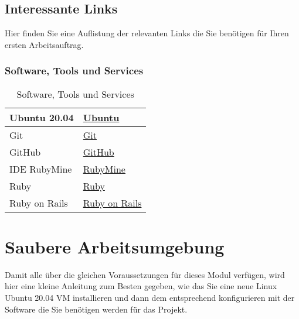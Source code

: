 \subsection{Interessante Links}\label{subsec:links}
\begin{frame}[fragile]
    Hier finden Sie eine Auflistung der relevanten Links die Sie benötigen für Ihren ersten Arbeitsauftrag.
\end{frame}

\begin{frame}[fragile]
    \frametitle<presentation>{Software, Tools und Services}
    \begin{table}[h!]
        \centering
        \begin{tabularx}{0.8\textwidth} {
        | >{\raggedright\arraybackslash}X
        | >{\raggedright\arraybackslash}X | }
            \hline
            Ubuntu 20.04  & \href{https://ubuntu.com/}{Ubuntu}                              \\
            \hline
            Git           & \href{https://git-scm.com/}{Git}                                \\
            \hline
            GitHub        & \href{https://github.com/}{GitHub}                              \\
            \hline
            IDE RubyMine  & \href{https://www.jetbrains.com/de-de/ruby/}{RubyMine}          \\
            \hline
            Ruby          & \href{https://www.ruby-lang.org/de/}{Ruby}                      \\
            \hline
            Ruby on Rails & \href{https://guides.rubyonrails.org/index.html}{Ruby on Rails} \\
            \hline
        \end{tabularx}
        \caption{Software, Tools und Services}
        \label{tab:2}
    \end{table}
\end{frame}


\section{Saubere Arbeitsumgebung}\label{sec:sauber}
\begin{frame}[fragile]
    Damit alle über die gleichen Voraussetzungen für dieses Modul verfügen, wird hier eine kleine Anleitung zum
    Besten gegeben, wie das Sie eine neue Linux Ubuntu 20.04 VM installieren und dann dem entsprechend konfigurieren
    mit der Software die Sie benötigen werden für das Projekt.
\end{frame}

